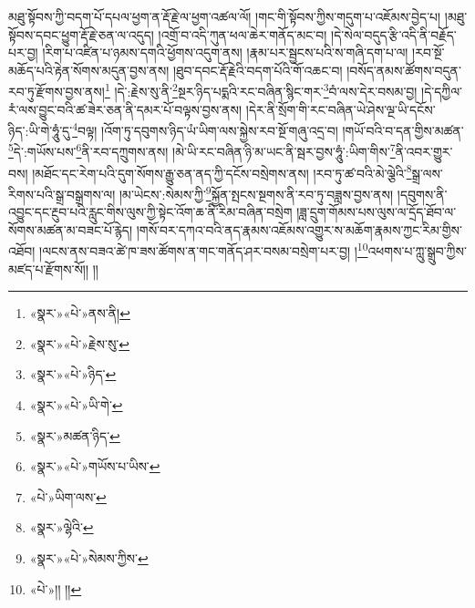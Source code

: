 མཐུ་སྟོབས་ཀྱི་བདག་པོ་དཔལ་ཕྱག་ན་རྡོ་རྗེ་ལ་ཕྱག་འཚལ་ལོ། །གང་གི་སྟོབས་ཀྱིས་གདུག་པ་འཇོམས་བྱེད་པ། །མཐུ་སྟོབས་དབང་ཕྱུག་རྡོ་རྗེ་ཅན་ལ་འདུད། །འགྲོ་བ་འདི་ཀུན་ཕལ་ཆེར་གནོད་མང་བ། །དེ་སེལ་བདུད་རྩི་འདི་ནི་བརྗོད་པར་བྱ། །རིག་པ་འཛིན་པ་ཉམས་དགའི་ཕྱོགས་འདུག་ནས། །རྣམ་པར་སྦྱངས་པའི་ས་གཞི་དག་པ་ལ། །རབ་སྔོ་མཆོད་པའི་རྟེན་སོགས་མདུན་བྱས་ནས། །ཐུབ་དབང་རྡོ་རྗེའི་བདག་པོའི་གོ་འཆང་བ། །བསོད་ནམས་ཚོགས་བདུན་རབ་ཏུ་རྫོགས་བྱས་ནས།\footnote{«སྣར་»«པེ་»ནས་ནི།} །དེ་:རྗེས་སུ་ནི་\footnote{«སྣར་»«པེ་»རྗེས་སུ་}སྔར་ཉིད་པདྨའི་རང་བཞིན་སྙིང་གར་\footnote{«སྣར་»«པེ་»ཉིད་}བཾ་ལས་དེར་བསམ་བྱ། །དེ་དཀྱིལ་རཾ་ལས་བྱུང་བའི་ཚ་ཟེར་ཅན་ནི་དམར་པོ་བལྟས་བྱས་ནས། །དེར་ནི་སྲོག་གི་རང་བཞིན་ཡེ་ཤེས་ལྔ་ཡི་དངོས་ཉིད་:ཡི་གེ་ཧཱུཾ་དུ་\footnote{«སྣར་»«པེ་»ཡི་གེ་}བལྟ། །འོག་ཏུ་དབུགས་ཉིད་ཡཾ་ཡིག་ལས་སྐྱེས་རབ་སྔོ་གཞུ་འདྲ་བ། །གཡོ་བའི་བ་དན་གྱིས་མཚན་\footnote{«སྣར་»མཚན་ཉིད་}དེ་:གཡོས་པས་\footnote{«སྣར་»«པེ་»གཡོས་པ་ཡིས་}ནི་རབ་དཀྲུགས་ནས། །མེ་ཡི་རང་བཞིན་ཉི་མ་ཡང་ནི་སྦར་བྱས་ཧཱུཾ་:ཡིག་གིས་\footnote{«པེ་»ཡིག་ལས་}ནི་འབར་གྱུར་བས། །མཐོང་དང་རེག་པའི་དུག་སོགས་རྒྱུ་ཅན་ནད་ཀྱི་དངོས་བསྲེགས་ནས། །རབ་ཏུ་ཚ་བའི་མེ་ལྕེའི་\footnote{«སྣར་»ལྷེའི་}སྒྲ་ལས་རིགས་པའི་སྒྲ་བསྒྲགས་ལ། །མ་ཡེངས་:སེམས་ཀྱི་\footnote{«སྣར་»«པེ་»སེམས་ཀྱིས་}སྐྱོན་སྤངས་སྔགས་ནི་རབ་ཏུ་བཟླས་བྱས་ནས། །དབུགས་ནི་འབྱུང་དང་རྔུབ་པའི་རླུང་གིས་ལུས་ཀྱི་སྟེང་འོག་ཆ་ནི་རིམ་བཞིན་བསྲེག །ཟླ་དྲུག་གོམས་པས་ལུས་ལ་དྲོད་ཐོབ་ལ་སོགས་མཚན་མ་བཟང་པོ་རྙེད། །གསོ་བར་དཀའ་བའི་ནད་རྣམས་འཇོམས་འགྱུར་ས་མཆོག་རྣམས་ཀྱང་རིམ་གྱིས་འཐོབ། །ལངས་ནས་བཟའ་ཚེ་ཁ་ཟས་ཚོགས་ན་གང་གནོད་ཤར་བསམ་བསྲེག་པར་བྱ། །\footnote{«པེ་»།། །།}འཕགས་པ་ཀླུ་སྒྲུབ་ཀྱིས་མཛད་པ་རྫོགས་སོ།། །།